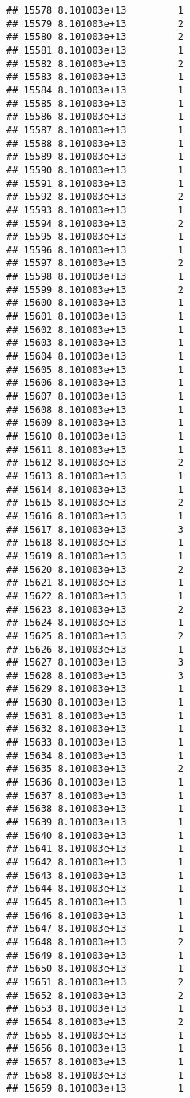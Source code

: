 \documentclass[
]{article}
\begin{document}
\begin{verbatim}
## 15578 8.101003e+13         1
## 15579 8.101003e+13         2
## 15580 8.101003e+13         2
## 15581 8.101003e+13         1
## 15582 8.101003e+13         2
## 15583 8.101003e+13         1
## 15584 8.101003e+13         1
## 15585 8.101003e+13         1
## 15586 8.101003e+13         1
## 15587 8.101003e+13         1
## 15588 8.101003e+13         1
## 15589 8.101003e+13         1
## 15590 8.101003e+13         1
## 15591 8.101003e+13         1
## 15592 8.101003e+13         2
## 15593 8.101003e+13         1
## 15594 8.101003e+13         2
## 15595 8.101003e+13         1
## 15596 8.101003e+13         1
## 15597 8.101003e+13         2
## 15598 8.101003e+13         1
## 15599 8.101003e+13         2
## 15600 8.101003e+13         1
## 15601 8.101003e+13         1
## 15602 8.101003e+13         1
## 15603 8.101003e+13         1
## 15604 8.101003e+13         1
## 15605 8.101003e+13         1
## 15606 8.101003e+13         1
## 15607 8.101003e+13         1
## 15608 8.101003e+13         1
## 15609 8.101003e+13         1
## 15610 8.101003e+13         1
## 15611 8.101003e+13         1
## 15612 8.101003e+13         2
## 15613 8.101003e+13         1
## 15614 8.101003e+13         1
## 15615 8.101003e+13         2
## 15616 8.101003e+13         1
## 15617 8.101003e+13         3
## 15618 8.101003e+13         1
## 15619 8.101003e+13         1
## 15620 8.101003e+13         2
## 15621 8.101003e+13         1
## 15622 8.101003e+13         1
## 15623 8.101003e+13         2
## 15624 8.101003e+13         1
## 15625 8.101003e+13         2
## 15626 8.101003e+13         1
## 15627 8.101003e+13         3
## 15628 8.101003e+13         3
## 15629 8.101003e+13         1
## 15630 8.101003e+13         1
## 15631 8.101003e+13         1
## 15632 8.101003e+13         1
## 15633 8.101003e+13         1
## 15634 8.101003e+13         1
## 15635 8.101003e+13         2
## 15636 8.101003e+13         1
## 15637 8.101003e+13         1
## 15638 8.101003e+13         1
## 15639 8.101003e+13         1
## 15640 8.101003e+13         1
## 15641 8.101003e+13         1
## 15642 8.101003e+13         1
## 15643 8.101003e+13         1
## 15644 8.101003e+13         1
## 15645 8.101003e+13         1
## 15646 8.101003e+13         1
## 15647 8.101003e+13         1
## 15648 8.101003e+13         2
## 15649 8.101003e+13         1
## 15650 8.101003e+13         1
## 15651 8.101003e+13         2
## 15652 8.101003e+13         2
## 15653 8.101003e+13         1
## 15654 8.101003e+13         2
## 15655 8.101003e+13         1
## 15656 8.101003e+13         1
## 15657 8.101003e+13         1
## 15658 8.101003e+13         1
## 15659 8.101003e+13         1

\end{verbatim}
\end{document}
